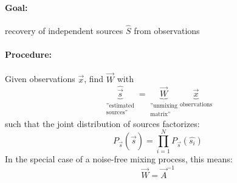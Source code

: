 \begin{table}[h]
  \centering
{}
  \caption{Overview of the 2 approaches: Note that the two approaches are equivalent if the 
  ``transition functions'' $\hat f_i$ match the marginal distribution functions of the 
  true independent sources i.e. $f_i = cdf(s_i)$.}
  \label{tab:approach}
\end{table}

\paragraph{Goal:} recovery of independent sources $\hat{S}$ from observations

\paragraph{Procedure:}
Given observations $\vec{x}$, find $\vec{W}$ with 
\begin{equation}
	\underbrace{ \widehat{\vec{s}} }_{ \substack{ 	\text{''estimated} \\
							\text{sources''}} }
	= \underbrace{ \vec{W} }_{ \substack{	\text{''unmixing} \\
						\text{matrix''}} }
	\underbrace{ \vec{x} }_{ \text{observations} }
\end{equation}
such that the joint distribution of sources factorizes:
\begin{equation}
	P_{\vec{s}} (\widehat{\vec{s}}) 
	= \prod_{i = 1}^N P_{\vec{s}}(\widehat{s_i})
\end{equation}
In the special case of a noise-free mixing process, this means:
\begin{equation}
	\vec{W} = \vec{A}^{-1}
\end{equation}


